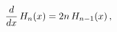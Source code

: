 \[\frac{d}{dx}\mathop{H_{n}\/}\nolimits\!\left(x\right)=2n\mathop{H_{n-1}\/}%
\nolimits\!\left(x\right),\]